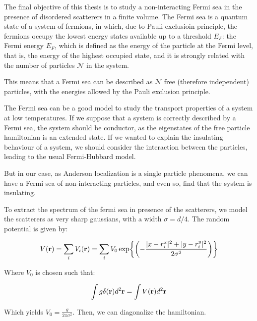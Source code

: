 The final objective of this thesis is to study a non-interacting Fermi sea in the presence of disordered scatterers in a finite volume. The Fermi sea is a quantum state of a system of fermions, in which, due to Pauli exclusioin principle, the fermions occupy the lowest energy states available up to a threshold $E_F$: the Fermi energy $E_F$, which is defined as the energy of the particle at the Fermi level, that is, the energy of the highest occupied state, and it is strongly related with the number of particles $\mathcal N$ in the system.

This means that a Fermi sea can be described as $\mathcal{N}$ free (therefore independent) particles, with the energies allowed by the Pauli exclusion principle. 

The Fermi sea can be a good model to study the transport properties of a system at low temperatures. If we suppose that a system is correctly described by a Fermi sea, the system should be conductor, as the eigenstates of the free particle hamiltonian is an extended state. If we wanted to explain the insulating behaviour of a system, we should consider the interaction between the particles, leading to the usual Fermi-Hubbard model.

But in our case, as Anderson localization is a single particle phenomena, we can have a Fermi sea of non-interacting particles, and even so, find that the system is insulating.
\color{blue}
{To extract the spectrum of the fermi sea in presence of the scatterers, we model the scatterers as very sharp gaussians, with a width $\sigma = d/4$. The random potential is given by:

\begin{equation}
    V(\vb{r}) = \sum_i V_i(\vb{r}) = \sum_i V_0\exp{\qty(-\frac{|x-{r}^x_i|^2+|y-{r}^y_i|^2}{2\sigma^2})}
\end{equation}

Where $V_0$ is chosen such that:

\begin{equation}
    \int g\delta(\vb{r})d^2 \vb{r}=\int V(\vb{r})d^2 \vb{r}
\end{equation}

Which yields $V_0 = \frac{g}{2\pi\sigma^2}$. Then, we can diagonalize the hamiltonian.}
\color{black}